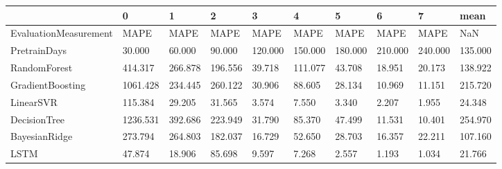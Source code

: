 \begin{tabular}{llllllllll}
\toprule
{} &        0 &       1 &       2 &       3 &       4 &       5 &       6 &       7 &    mean \\
\midrule
EvaluationMeasurement &     MAPE &    MAPE &    MAPE &    MAPE &    MAPE &    MAPE &    MAPE &    MAPE &     NaN \\
PretrainDays          &   30.000 &  60.000 &  90.000 & 120.000 & 150.000 & 180.000 & 210.000 & 240.000 & 135.000 \\
RandomForest          &  414.317 & 266.878 & 196.556 &  39.718 & 111.077 &  43.708 &  18.951 &  20.173 & 138.922 \\
GradientBoosting      & 1061.428 & 234.445 & 260.122 &  30.906 &  88.605 &  28.134 &  10.969 &  11.151 & 215.720 \\
LinearSVR             &  115.384 &  29.205 &  31.565 &   3.574 &   7.550 &   3.340 &   2.207 &   1.955 &  24.348 \\
DecisionTree          & 1236.531 & 392.686 & 223.949 &  31.790 &  85.370 &  47.499 &  11.531 &  10.401 & 254.970 \\
BayesianRidge         &  273.794 & 264.803 & 182.037 &  16.729 &  52.650 &  28.703 &  16.357 &  22.211 & 107.160 \\
LSTM                  &   47.874 &  18.906 &  85.698 &   9.597 &   7.268 &   2.557 &   1.193 &   1.034 &  21.766 \\
\bottomrule
\end{tabular}
